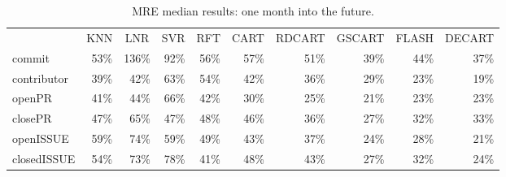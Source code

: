\documentclass[smallextended]{svjour3}
\begin{document}
\begin{table}[!t]
\centering
\caption{
MRE median  results:  one month into the future. }
\label{tbl:med_mre}
\begin{adjustbox}{max width=0.96\textwidth}     
\begin{tabular}{lrrrrrrrrr}
            & \multicolumn{1}{c}{KNN}      & \multicolumn{1}{c}{LNR}       & \multicolumn{1}{c}{SVR}      & \multicolumn{1}{c}{RFT}      & \multicolumn{1}{c}{CART}     & \multicolumn{1}{c}{RDCART}   & \multicolumn{1}{c}{GSCART}   & \multicolumn{1}{c}{FLASH}    & \multicolumn{1}{c}{DECART}   \\
commit      & \cellcolor[HTML]{F0F0F0}53\% & \cellcolor[HTML]{F8F8F8}136\% & \cellcolor[HTML]{F4F4F4}92\% & \cellcolor[HTML]{F0F0F0}56\% & \cellcolor[HTML]{F0F0F0}57\% & \cellcolor[HTML]{EFEFEF}51\% & \cellcolor[HTML]{D8D8D8}39\% & \cellcolor[HTML]{EFEFEF}44\% & \cellcolor[HTML]{C9C9C9}37\% \\
contributor & \cellcolor[HTML]{D8D8D8}39\% & \cellcolor[HTML]{EFEFEF}42\%  & \cellcolor[HTML]{F1F1F1}63\% & \cellcolor[HTML]{F0F0F0}54\% & \cellcolor[HTML]{EFEFEF}42\% & \cellcolor[HTML]{C2C2C2}36\% & \cellcolor[HTML]{8D8D8D}29\% & \cellcolor[HTML]{606060}23\% & \cellcolor[HTML]{434343}19\% \\
openPR      & \cellcolor[HTML]{E7E7E7}41\% & \cellcolor[HTML]{EFEFEF}44\%  & \cellcolor[HTML]{F1F1F1}66\% & \cellcolor[HTML]{EFEFEF}42\% & \cellcolor[HTML]{959595}30\% & \cellcolor[HTML]{6F6F6F}25\% & \cellcolor[HTML]{515151}21\% & \cellcolor[HTML]{606060}23\% & \cellcolor[HTML]{606060}23\% \\
closePR     & \cellcolor[HTML]{EFEFEF}47\% & \cellcolor[HTML]{F1F1F1}65\%  & \cellcolor[HTML]{EFEFEF}47\% & \cellcolor[HTML]{EFEFEF}48\% & \cellcolor[HTML]{EFEFEF}46\% & \cellcolor[HTML]{C2C2C2}36\% & \cellcolor[HTML]{7E7E7E}27\% & \cellcolor[HTML]{A4A4A4}32\% & \cellcolor[HTML]{ABABAB}33\% \\
openISSUE   & \cellcolor[HTML]{F0F0F0}59\% & \cellcolor[HTML]{F2F2F2}74\%  & \cellcolor[HTML]{F0F0F0}59\% & \cellcolor[HTML]{EFEFEF}49\% & \cellcolor[HTML]{EFEFEF}43\% & \cellcolor[HTML]{C9C9C9}37\% & \cellcolor[HTML]{686868}24\% & \cellcolor[HTML]{868686}28\% & \cellcolor[HTML]{515151}21\% \\
closedISSUE & \cellcolor[HTML]{F0F0F0}54\% & \cellcolor[HTML]{F2F2F2}73\%  & \cellcolor[HTML]{F2F2F2}78\% & \cellcolor[HTML]{E7E7E7}41\% & \cellcolor[HTML]{EFEFEF}48\% & \cellcolor[HTML]{EFEFEF}43\% & \cellcolor[HTML]{7E7E7E}27\% & \cellcolor[HTML]{A4A4A4}32\% & \cellcolor[HTML]{686868}24\%
\end{tabular}
\end{adjustbox}   
\end{table}
\end{document}

